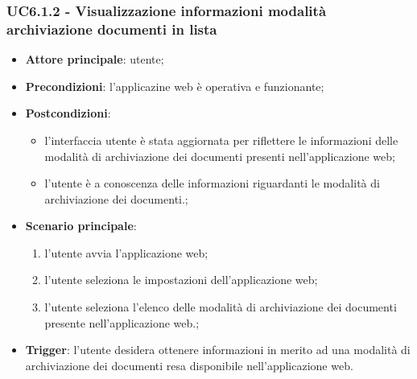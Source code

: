 \documentclass[10pt, a4paper]{article}
\begin{document}
    \subsubsection{UC6.1.2 - Visualizzazione informazioni modalità archiviazione documenti in lista}
    \begin{itemize}
        \item \textbf{Attore principale}: utente;
        \item \textbf{Precondizioni}: l'applicazine web è operativa e funzionante;
        \item \textbf{Postcondizioni}: 
        \begin{itemize}
            \item l'interfaccia utente è stata aggiornata per riflettere le informazioni delle modalità di archiviazione dei documenti presenti nell'applicazione web;
            \item l'utente è a conoscenza delle informazioni riguardanti le modalità di archiviazione dei documenti.; 
        \end{itemize}
        \item \textbf{Scenario principale}:
            \begin{enumerate}
                \item l'utente avvia l'applicazione web;
                \item l'utente seleziona le impostazioni dell'applicazione web;
                \item l'utente seleziona l'elenco delle modalità di archiviazione dei documenti presente nell'applicazione web.;
            \end{enumerate}
        \item \textbf{Trigger}: l'utente desidera ottenere informazioni in merito ad una modalità di archiviazione dei documenti resa disponibile nell'applicazione web.
    \end{itemize}
\end{document}
